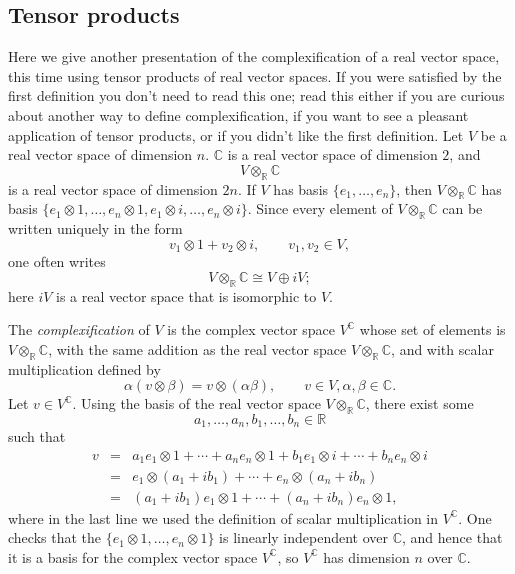 \documentclass{article}
\begin{document}
\subsection{Tensor products}
Here we give another presentation of the complexification of a real vector space, this time using tensor products
of real vector spaces. If you were satisfied by the first definition you don't need to read this one; read this either if you are curious
about another way to define complexification, if you want to see a pleasant application of tensor products, or if you didn't like the first
definition.
Let $V$ be a real vector space of dimension $n$. $\mathbb{C}$ is a real vector space of dimension $2$, and
\[
V \otimes_{\mathbb{R}} \mathbb{C}
\]
is a real vector space of dimension $2n$. If $V$ has basis $\{e_1,\ldots,e_n\}$, then $V \otimes_{\mathbb{R}} \mathbb{C}$
has basis $\{e_1 \otimes 1, \ldots, e_n \otimes 1, e_1 \otimes i, \ldots, e_n \otimes i\}$.
Since every element of $V \otimes_{\mathbb{R}} \mathbb{C}$ can be written uniquely in the form
\[
v_1 \otimes 1 + v_2 \otimes i, \qquad v_1, v_2 \in V,
\]
one often writes
\[
V \otimes_{\mathbb{R}} \mathbb{C} \cong V \oplus iV;
\]
here $iV$ is a real vector space that is isomorphic to $V$. 


The {\em complexification} of $V$ is the
complex vector space $V^\mathbb{C}$ whose set of elements is $V \otimes_{\mathbb{R}} \mathbb{C}$, with the same addition
as the real vector space $V \otimes_{\mathbb{R}} \mathbb{C}$, and with scalar multiplication defined by
\[
\alpha(v \otimes \beta)=v \otimes (\alpha \beta), \qquad v \in V, \alpha,\beta \in \mathbb{C}.
\]
Let $v \in V^\mathbb{C}$. Using the basis of the real vector space $V \otimes_{\mathbb{R}} \mathbb{C}$, there exist some 
\[
a_1,\ldots,a_n,b_1,\ldots,b_n \in \mathbb{R}
\]
 such that
\begin{eqnarray*}
v&=&a_1 e_1 \otimes 1 + \cdots + a_n e_n \otimes 1 + b_1 e_1 \otimes i + \cdots + b_n e_n \otimes i\\
&=&e_1 \otimes (a_1+ib_1) + \cdots +e_n \otimes (a_n + ib_n)\\
&=&(a_1+ib_1) e_1 \otimes 1 + \cdots + (a_n+ib_n) e_n \otimes 1,
\end{eqnarray*}
where in the last line we used the definition of scalar multiplication in $V^\mathbb{C}$. One checks
that the 
$\{e_1 \otimes 1,\ldots, e_n \otimes 1\}$ is linearly independent over $\mathbb{C}$, and hence that it is a basis for the complex vector space $V^\mathbb{C}$,
so $V^\mathbb{C}$ has dimension $n$ over $\mathbb{C}$.
\end{document}
